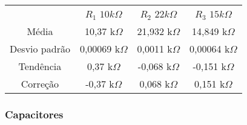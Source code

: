 \documentclass[12pt,twoside, a4paper, twocolumn]{article}
\begin{document}
\begin{center}
    \begin{tabular}{ |c|c|c|c| }
        \hline
                      & $R_1$ $10k\varOmega$ & $R_2$ $22k\varOmega$ & $R_3$ $15k\varOmega$ \\
        Média         & 10,37 k$\varOmega$   & 21,932 k$\varOmega$  & 14,849 k$\varOmega$  \\
        Desvio padrão & 0,00069 k$\varOmega$ & 0,0011 k$\varOmega$  & 0,00064 k$\varOmega$ \\
        Tendência     & 0,37 k$\varOmega$    & -0,068 k$\varOmega$  & -0,151 k$\varOmega$  \\
        Correção      & -0,37 k$\varOmega$   & 0,068 k$\varOmega$   & 0,151 k$\varOmega$   \\


        \hline
    \end{tabular}
\end{center}

\subsubsection{Capacitores}
\end{document}
